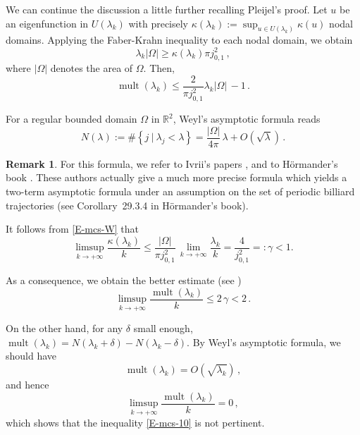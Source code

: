 \documentclass[12pt,a4paper]{amsart}
\theoremstyle{plain} %
\theoremstyle{definition}
\newtheorem{remark}[theorem]{Remark}
\numberwithin{equation}{section}
\numberwithin{figure}{section}
\numberwithin{table}{section}
\newcommand{\R}{\mathbb{R}}
\DeclareMathOperator{\mult}{mult}
\newcommand{\set}[1]{\left\lbrace #1 \right\rbrace}
\begin{document}
We can continue the discussion a little further recalling Pleijel's proof. Let $u$ be an eigenfunction in $U(\lambda_k)$ with precisely $\kappa(\lambda_k) := \sup_{u \in U(\lambda_k)} \kappa(u)$ nodal domains. Applying the Faber-Krahn inequality to each nodal domain, we obtain
%
\begin{equation*}\label{E-mcs-4f}
\lambda_k |\Omega| \ge \kappa(\lambda_k) \pi j_{0,1}^2\,,
\end{equation*}
%
where $|\Omega|$ denotes the area of $\Omega$. Then,
%
\begin{equation}\label{E-mcs-4}
\mult(\lambda_k) \leq \frac{2}{\pi j_{0,1}^2} \lambda_k |\Omega|\,  -1\,.
\end{equation}

For a regular bounded domain $\Omega$ in $\R^2$, Weyl's asymptotic formula reads
%
\begin{equation}\label{E-mcs-W}
N(\lambda) := \# \set{j~|~ \lambda_j < \lambda} = \frac{|\Omega|}{4\pi} \, \lambda + O(\sqrt{\lambda})\,.
\end{equation}

\begin{remark}\label{R-mcs-2}
For this formula, we refer to Ivrii's papers \cite{Ivri1980r, Ivri1980}, and to H\"{o}rmander's book \cite[Theorem~29.3.3]{Horm2009d}. These authors actually give a much more precise formula which yields a two-term asymptotic formula under an assumption on the set of periodic billiard trajectories (see Corollary~29.3.4 in H\"{o}rmander's book).
\end{remark}%

It follows from \eqref{E-mcs-W} that
%
\begin{equation}\label{E-mcs-6}
\limsup_{k\rightarrow +\infty} \frac{\kappa(\lambda_k)}{k} \le \frac{|\Omega|}{\pi j_{0,1}^2}\, \lim_{k\rightarrow +\infty} \frac{\lambda_k}{k} = \frac{4}{j_{0,1}^2} =: \gamma < 1.
\end{equation}

As a consequence, we obtain the better estimate (see \cite{Plej1956})
%
\begin{equation}\label{E-mcs-10}
\limsup_{k\rightarrow +\infty} \frac{\mult(\lambda_k)}{k} \le 2 \, \gamma < 2\,.
\end{equation}

On the other hand, for any $\delta$ small enough, $\mult(\lambda_k) = N(\lambda_k+\delta) - N(\lambda_k - \delta)$. By Weyl's asymptotic formula, we should have
%
$$
\mult(\lambda_k) = O(\sqrt{\lambda_k})\,,
$$
%
and hence
%
$$
\limsup_{k\rightarrow +\infty} \frac{\mult(\lambda_k)}{k} = 0\,,
$$
%
which shows that the inequality \eqref{E-mcs-10} is not pertinent.\medskip
\end{document}
